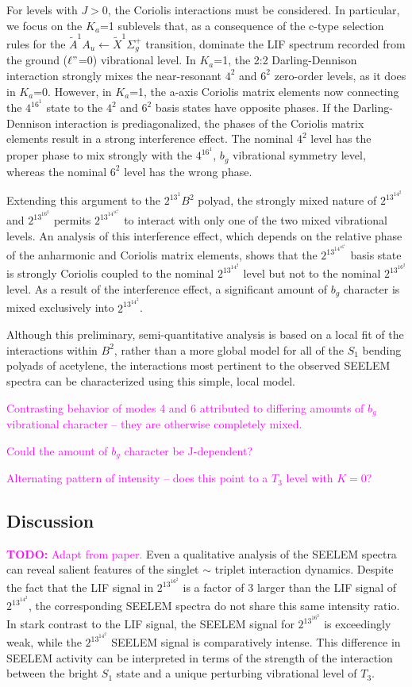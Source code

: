 \documentclass[12pt,draft]{mitthesis}
\newcommand{\TODO} [1]{\textcolor{magenta}{\textbf{TODO:} #1}}
\newcommand{\POINT}[1]{\textcolor{magenta}{#1}}
\begin{document}
For levels with $J>0$, the Coriolis interactions must be
considered. In particular, we focus on the $K_a$=1 sublevels that, as
a consequence of the c-type selection rules for the $\tilde{A}^1A_u
\leftarrow \tilde{X} ^1\Sigma_g^+$ transition, dominate the LIF
spectrum recorded from the ground ($\ell"$=0) vibrational level. In
$K_a$=1, the 2:2 Darling-Dennison interaction strongly mixes the
near-resonant $4^2$ and $6^2$ zero-order levels, as it does in
$K_a$=0. However, in $K_a$=1, the a-axis Coriolis matrix elements now
connecting the $4^16^1$ state to the $4^2$ and $6^2$ basis states have
opposite phases. If the Darling-Dennison interaction is
prediagonalized, the phases of the Coriolis matrix elements result in
a strong interference effect. The nominal $4^2$ level has the proper
phase to mix strongly with the $4^16^1$, $b_g$ vibrational symmetry
level, whereas the nominal $6^2$ level has the wrong phase.

Extending this argument to the $2^13^1B^2$ polyad, the strongly mixed
nature of $2^13^14^2$ and $2^13^16^2$ permits $2^13^14^16^1$ to
interact with only one of the two mixed vibrational levels. An
analysis of this interference effect, which depends on the relative
phase of the anharmonic and Coriolis matrix elements, shows that the
 $2^13^14^16^1$ basis state is strongly Coriolis coupled to the nominal
$2^13^14^2$ level but not to the nominal $2^13^16^2$ level. As a result
of the interference effect, a significant amount of $b_g$ character is
mixed exclusively into $2^13^14^2$.

Although this preliminary, semi-quantitative analysis is based on a
local fit of the interactions within $B^2$, rather than a more global
model for all of the $S_1$ bending polyads of acetylene, the interactions
most pertinent to the observed SEELEM spectra can be characterized
using this simple, local model.

\POINT{Contrasting behavior of modes 4 and 6 attributed to differing
  amounts of $b_g$ vibrational character -- they are otherwise
  completely mixed.}

\POINT{Could the amount of $b_g$ character be J-dependent?}

\POINT{Alternating pattern of intensity -- does this point to a $T_3$
  level with $K=0$?}

\subsection{Discussion}

\TODO{Adapt from paper.}  Even a qualitative analysis of the SEELEM
spectra can reveal salient features of the singlet $\sim$ triplet
interaction dynamics. Despite the fact that the LIF signal in
$2^13^16^2$ is a factor of 3 larger than the LIF signal of
$2^13^14^2$, the corresponding SEELEM spectra do not share this same
intensity ratio. In stark contrast to the LIF signal, the SEELEM
signal for $2^13^16^2$ is exceedingly weak, while the $2^13^14^2$
SEELEM signal is comparatively intense. This difference in SEELEM
activity can be interpreted in terms of the strength of the
interaction between the bright $S_1$ state and a unique perturbing
vibrational level of $T_3$.
\end{document}

